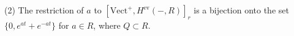 (2) The restriction of $a$ to $[\text{Vect}^+, H^{\text{ev}}(-, R)]_r$ is a bijection onto the set $\{0, e^{at} + e^{-at}\}$ for $a \in R$, where $Q \subset R$.
